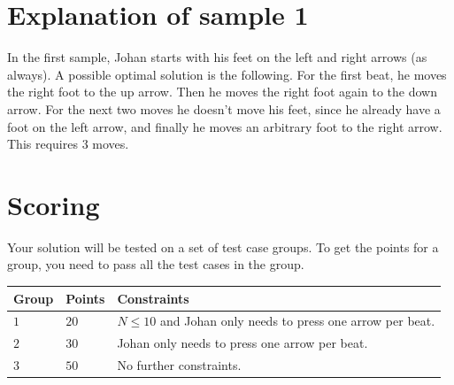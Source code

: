 \section*{Explanation of sample 1}
In the first sample, Johan starts with his feet on the left and right arrows (as always).
A possible optimal solution is the following.
For the first beat, he moves the right foot to the up arrow.
Then he moves the right foot again to the down arrow.
For the next two moves he doesn't move his feet, since he already have a foot on the left arrow, and finally he moves an arbitrary foot to the right arrow.
This requires $3$ moves.

\section*{Scoring}
Your solution will be tested on a set of test case groups.
To get the points for a group, you need to pass all the test cases in the group.

\noindent
\begin{tabular}{| l | l | p{10cm} |}
\hline
Group & Points & Constraints \\ \hline
  $1$    & $20$        & $N \le 10$ and Johan only needs to press one arrow per beat. \\ \hline 
  $2$    & $30$        & Johan only needs to press one arrow per beat. \\ \hline
  $3$    & $50$        & No further constraints. \\ \hline 
\end{tabular}

